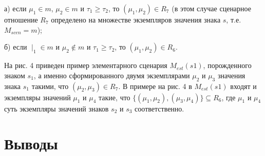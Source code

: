 а) если $\mu_1\in m$, $\mu_2\in m$ и $\tau_1\geqslant\tau_2$, то $(\mu_1,\mu_2)\in R_7$ (в этом случае сценарное отношение $R_7$ определено на множестве экземпляров значения знака $s$, т.е. $M_{scen}=m$);

б) если $\mid_1\in m$ и $\mu_2\not\in m$ и $\tau_1\geqslant\tau_2$, то $(\mu_1,\mu_2)\in R_6$.

На рис. 4 приведен пример элементарного сценария $M_{est}(s1)$, порожденного знаком $s_1$, а именно сформированного двумя экземплярами $\mu_2$ и $\mu_3$ значения знака $s_1$ такими, что $(\mu_2,\mu_3)\in R_7$. В примере на рис. 4 в $M_{est}(s1)$ входят и экземпляры значений $\mu_1$ и $\mu_4$ такие, что $\{(\mu_1,\mu_2),(\mu_3,\mu_4)\}\subseteq R_6$, где $\mu_1$ и $\mu_4$ суть экземпляры значений знаков $s_2$ и $s_3$ соответственно.



\section{Выводы} \label{sect2_5}


\clearpage
